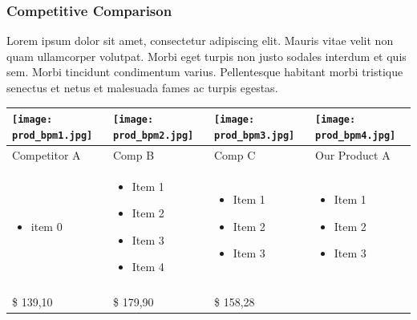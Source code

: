 \documentclass[11pt,titlepage]{article}
\begin{document}
\subsubsection{Competitive Comparison}
Lorem ipsum dolor sit amet, consectetur adipiscing elit. Mauris vitae velit 
non quam ullamcorper volutpat. Morbi eget turpis non justo sodales interdum 
et quis sem. Morbi tincidunt condimentum varius. Pellentesque habitant morbi 
tristique senectus et netus et malesuada fames ac turpis egestas.\newline
\begin{tabular}{| m{92 pt} | m{92 pt} | m{92 pt} | m{92 pt} |}\hline
  \texttt{[image: prod\_bpm1.jpg]} & 
  \texttt{[image: prod\_bpm2.jpg]} & 
  \texttt{[image: prod\_bpm3.jpg]} & 
  \texttt{[image: prod\_bpm4.jpg]} \\ \hline
  Competitor A & Comp B & Comp C & Our Product A\\ \hline
  \begin{itemize} \tiny \item  item 0 \end{itemize} & 
  \begin{itemize} \tiny 
  \item Item 1
  \item Item 2
  \item Item 3
  \item Item 4\end{itemize} & 
    \begin{itemize} \tiny 
    \item Item 1
    \item Item 2
    \item Item 3\end{itemize}& 
      \begin{itemize} \tiny 
      \item Item 1
      \item Item 2
      \item Item 3 \end{itemize} \\
      & & & \\ \hline
      \$ 139,10 & \$ 179,90 & \$ 158,28 & \\ \hline
\end{tabular}
\end{document}
